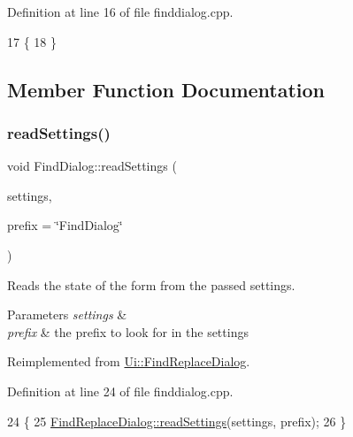 Definition at line 16 of file finddialog.\+cpp.


\begin{DoxyCode}
17 \{
18 \}
\end{DoxyCode}


\subsection{Member Function Documentation}
\mbox{\label{class_ui_1_1_find_dialog_adcb3b60f3a1a4a41f7edddf7b203ba44}} 
\subsubsection{\texorpdfstring{read\+Settings()}{readSettings()}}
{\footnotesize\ttfamily void Find\+Dialog\+::read\+Settings (\begin{DoxyParamCaption}\item[{Q\+Settings \&}]{settings,  }\item[{const Q\+String \&}]{prefix = {\ttfamily \char`\"{}FindDialog\char`\"{}} }\end{DoxyParamCaption})\hspace{0.3cm}{\ttfamily [virtual]}}

Reads the state of the form from the passed settings. 
\begin{DoxyParams}{Parameters}
{\em settings} & \\
\hline
{\em prefix} & the prefix to look for in the settings \\
\hline
\end{DoxyParams}


Reimplemented from \hyperlink{class_ui_1_1_find_replace_dialog_a2be8b8724a5f9a7e6dff30348f94761c}{Ui\+::\+Find\+Replace\+Dialog}.



Definition at line 24 of file finddialog.\+cpp.


\begin{DoxyCode}
24                                                                         \{
25     \hyperlink{class_ui_1_1_find_replace_dialog_a2be8b8724a5f9a7e6dff30348f94761c}{FindReplaceDialog::readSettings}(settings, prefix);
26 \}
\end{DoxyCode}
\mbox{\label{class_ui_1_1_find_dialog_a8d54b1576e6325b41e5989fa2cec0d26}} 
